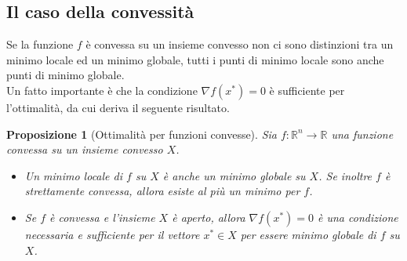 \documentclass[a4paper, 12pt]{article}
\newtheorem{prop}{Proposizione}
\begin{document}
\subsection{Il caso della convessità}
Se la funzione $f$ è convessa su un insieme convesso non ci sono distinzioni tra un minimo locale ed un minimo globale, tutti i punti di minimo locale sono anche punti di minimo globale.\\
Un fatto importante è che la condizione $\nabla f(x^\ast) = 0$ è sufficiente per l'ottimalità, da cui deriva il seguente risultato.
\begin{prop}[Ottimalità per funzioni convesse] Sia $f:\mathbb{R}^n \to \mathbb{R}$ una funzione convessa su un insieme convesso $X$.
\begin{itemize}
  \item Un minimo locale di $f$ su $X$ è anche un minimo globale su $X$. Se inoltre $f$ è strettamente convessa, allora esiste al più un minimo per $f$.
  \item Se $f$ è convessa e l'insieme $X$ è aperto, allora $\nabla f(x^\ast) = 0$ è una condizione necessaria e sufficiente per il vettore $x^\ast \in X$ per essere minimo globale di $f$ su $X$.
\end{itemize}
\end{prop}
\end{document}
